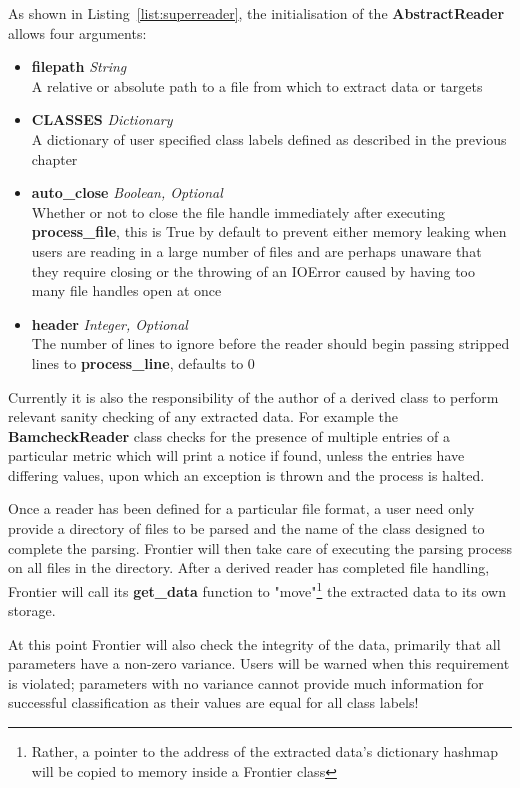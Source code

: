 As shown in Listing~\ref{list:superreader}, the initialisation of the
\textbf{AbstractReader} allows four arguments:

\begin{itemize}
    \item \textbf{filepath} \textit{String}\hfill\\
        A relative or absolute path to a file from which to extract data or
        targets
    \item \textbf{CLASSES} \textit{Dictionary}\hfill\\
        A dictionary of user specified class labels defined as described in
        the previous chapter
    \item \textbf{auto\_close} \textit{Boolean, Optional}\hfill\\
        Whether or not to close the file handle immediately after executing
        \textbf{process\_file}, this is True by default to prevent either memory
        leaking when users are reading in a large number of files and are
        perhaps unaware that they require closing or the throwing of an IOError
        caused by having too many file handles open at once
    \item \textbf{header} \textit{Integer, Optional}\hfill\\
        The number of lines to ignore before the reader should begin
        passing stripped lines to \textbf{process\_line}, defaults to 0
\end{itemize}

Currently it is also the responsibility of the author of a derived class to
perform relevant sanity checking of any extracted data. For example the
\textbf{BamcheckReader} class checks for the presence of multiple entries of a
particular metric which will print a notice if found, unless the entries have
differing values, upon which an exception is thrown and the process is halted.

Once a reader has been defined for a particular file format, a user need only
provide a directory of files to be parsed and the name of the class designed to
complete the parsing. Frontier will then take care of executing the parsing
process on all files in the directory. After a derived reader has completed file
handling, Frontier will call its \textbf{get\_data} function to
"move"\footnote{Rather, a pointer to the address of the extracted data's
dictionary hashmap will be copied to memory inside a Frontier class} the
extracted data to its own storage.

At this point Frontier will also check the integrity of the data, primarily that
all parameters have a non-zero variance. Users will be warned when this
requirement is violated; parameters with no variance cannot provide much
information for successful classification as their values are equal for all
class labels!

